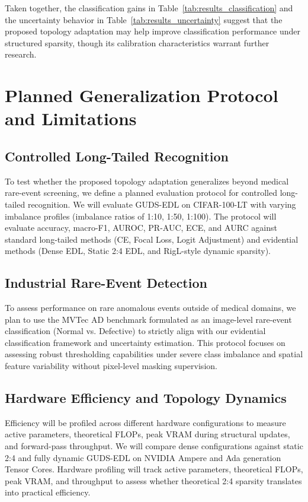 \documentclass[letterpaper]{article} %
\begin{document}
Taken together, the classification gains in Table~\ref{tab:results_classification} and the uncertainty behavior in Table~\ref{tab:results_uncertainty} suggest that the proposed topology adaptation may help improve classification performance under structured sparsity, though its calibration characteristics warrant further research.

\section{Planned Generalization Protocol and Limitations}\label{sec:planned_protocol}
\subsection{Controlled Long-Tailed Recognition}
To test whether the proposed topology adaptation generalizes beyond medical rare-event screening, we define a planned evaluation protocol for controlled long-tailed recognition. We will evaluate GUDS-EDL on CIFAR-100-LT with varying imbalance profiles (imbalance ratios of 1:10, 1:50, 1:100). The protocol will evaluate accuracy, macro-F1, AUROC, PR-AUC, ECE, and AURC against standard long-tailed methods (CE, Focal Loss, Logit Adjustment) and evidential methods (Dense EDL, Static 2:4 EDL, and RigL-style dynamic sparsity).

\subsection{Industrial Rare-Event Detection}
To assess performance on rare anomalous events outside of medical domains, we plan to use the MVTec AD benchmark formulated as an image-level rare-event classification (Normal vs. Defective) to strictly align with our evidential classification framework and uncertainty estimation. This protocol focuses on assessing robust thresholding capabilities under severe class imbalance and spatial feature variability without pixel-level masking supervision.

\subsection{Hardware Efficiency and Topology Dynamics}
Efficiency will be profiled across different hardware configurations to measure active parameters, theoretical FLOPs, peak VRAM during structural updates, and forward-pass throughput. We will compare dense configurations against static 2:4 and fully dynamic GUDS-EDL on NVIDIA Ampere and Ada generation Tensor Cores. Hardware profiling will track active parameters, theoretical FLOPs, peak VRAM, and throughput to assess whether theoretical 2:4 sparsity translates into practical efficiency.
\end{document}
